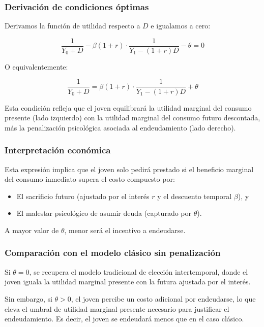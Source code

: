 \documentclass[10pt]{article}
\begin{document}
\begin{multicols}{2}
\subsubsection*{Derivación de condiciones óptimas}

Derivamos la función de utilidad respecto a $D$ e igualamos a cero:

\begin{equation}
\frac{1}{Y_0 + D} - \beta (1 + r) \cdot \frac{1}{Y_1 - (1 + r)D} - \theta = 0
\end{equation}

O equivalentemente:

\begin{equation}
\frac{1}{Y_0 + D} = \beta (1 + r) \cdot \frac{1}{Y_1 - (1 + r)D} + \theta
\end{equation}

Esta condición refleja que el joven equilibrará la utilidad marginal del consumo presente (lado izquierdo) con la utilidad marginal del consumo futuro descontada, más la penalización psicológica asociada al endeudamiento (lado derecho).

\subsubsection*{Interpretación económica}

Esta expresión implica que el joven solo pedirá prestado si el beneficio marginal del consumo inmediato supera el costo compuesto por:

\begin{itemize}
    \item El sacrificio futuro (ajustado por el interés $r$ y el descuento temporal $\beta$), y
    \item El malestar psicológico de asumir deuda (capturado por $\theta$).
\end{itemize}

A mayor valor de $\theta$, menor será el incentivo a endeudarse.

\subsubsection*{Comparación con el modelo clásico sin penalización}

Si $\theta = 0$, se recupera el modelo tradicional de elección intertemporal, donde el joven iguala la utilidad marginal presente con la futura ajustada por el interés.

Sin embargo, si $\theta > 0$, el joven percibe un costo adicional por endeudarse, lo que eleva el umbral de utilidad marginal presente necesario para justificar el endeudamiento. Es decir, el joven se endeudará menos que en el caso clásico.



\end{multicols}
\end{document}

